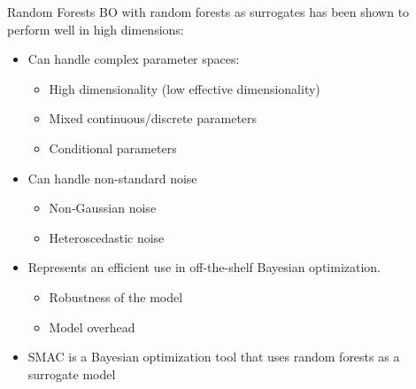 \begin{frame}{Random Forests}
BO with random forests as surrogates has been shown to perform well in high dimensions:
\begin{itemize}
    \item Can handle complex parameter spaces:
    \begin{itemize}
        \item High dimensionality (low effective dimensionality)
        \item Mixed continuous/discrete parameters
        \item Conditional parameters
        \pause
    \end{itemize}
    \item Can handle non-standard noise
    \pause
    \begin{itemize}
        \item Non-Gaussian noise
        \item Heteroscedastic noise
    \end{itemize}
    \item Represents an efficient use in off-the-shelf Bayesian optimization.
    \pause
    \begin{itemize}
        \item Robustness of the model
        \pause
        \item Model overhead
    \end{itemize}
    \item SMAC is a Bayesian optimization tool that uses random forests as a surrogate model
\end{itemize}
\end{frame}




